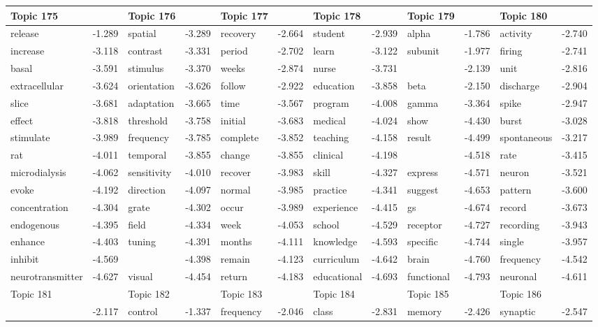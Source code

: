 \documentclass{article}
\begin{document}
\begin{table}
{\begin{tabular}{|l r|l r|l r|l r|l r|l r|}
\hline
\hline
Topic 175 & &Topic 176 & &Topic 177 & &Topic 178 & &Topic 179 & &Topic 180 &\\
\hline
release & -1.289 & spatial & -3.289 & recovery & -2.664 & student & -2.939 & alpha & -1.786 & activity & -2.740\\
increase & -3.118 & contrast & -3.331 & period & -2.702 & learn & -3.122 & subunit & -1.977 & firing & -2.741\\
basal & -3.591 & stimulus & -3.370 & weeks & -2.874 & nurse & -3.731 &  & -2.139 & unit & -2.816\\
extracellular & -3.624 & orientation & -3.626 & follow & -2.922 & education & -3.858 & beta & -2.150 & discharge & -2.904\\
slice & -3.681 & adaptation & -3.665 & time & -3.567 & program & -4.008 & gamma & -3.364 & spike & -2.947\\
effect & -3.818 & threshold & -3.758 & initial & -3.683 & medical & -4.024 & show & -4.430 & burst & -3.028\\
stimulate & -3.989 & frequency & -3.785 & complete & -3.852 & teaching & -4.158 & result & -4.499 & spontaneous & -3.217\\
rat & -4.011 & temporal & -3.855 & change & -3.855 & clinical & -4.198 &  & -4.518 & rate & -3.415\\
microdialysis & -4.062 & sensitivity & -4.010 & recover & -3.983 & skill & -4.327 & express & -4.571 & neuron & -3.521\\
evoke & -4.192 & direction & -4.097 & normal & -3.985 & practice & -4.341 & suggest & -4.653 & pattern & -3.600\\
concentration & -4.304 & grate & -4.302 & occur & -3.989 & experience & -4.415 & gs & -4.674 & record & -3.673\\
endogenous & -4.395 & field & -4.334 & week & -4.053 & school & -4.529 & receptor & -4.727 & recording & -3.943\\
enhance & -4.403 & tuning & -4.391 & months & -4.111 & knowledge & -4.593 & specific & -4.744 & single & -3.957\\
inhibit & -4.569 &  & -4.398 & remain & -4.123 & curriculum & -4.642 & brain & -4.760 & frequency & -4.542\\
neurotransmitter & -4.627 & visual & -4.454 & return & -4.183 & educational & -4.693 & functional & -4.793 & neuronal & -4.611\\
\hline
\hline
Topic 181 & &Topic 182 & &Topic 183 & &Topic 184 & &Topic 185 & &Topic 186 &\\
\hline
 & -2.117 & control & -1.337 & frequency & -2.046 & class & -2.831 & memory & -2.426 & synaptic & -2.547\\

\end{tabular}}
\end{table}
\end{document}
